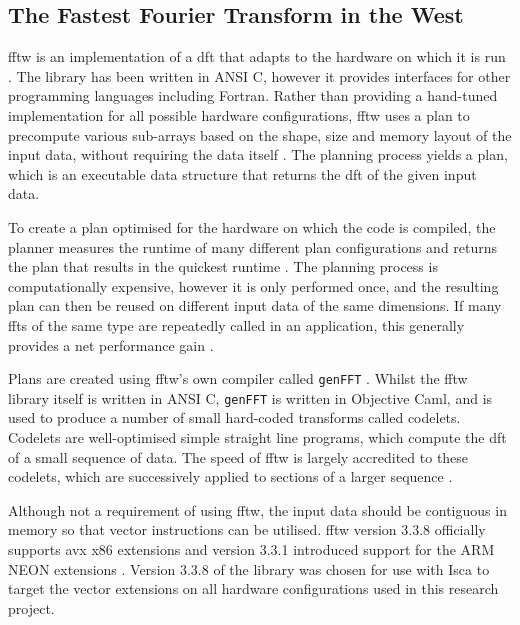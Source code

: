 \documentclass[a4paper,11pt]{report}
\begin{document}
\subsection{The Fastest Fourier Transform in the West}
\gls{fftw} is an implementation of a \gls{dft} that adapts to the hardware on which it is run \cite{frigo2005design}. The library has been written in ANSI C, however it provides interfaces for other programming languages including Fortran. Rather than providing a hand-tuned implementation for all possible hardware configurations, \gls{fftw} uses a plan to precompute various sub-arrays based on the shape, size and memory layout of the input data, without requiring the data itself \cite{frigo2005design}. The planning process yields a plan, which is an executable data structure that returns the \gls{dft} of the given input data. 
\par
To create a plan optimised for the hardware on which the code is compiled, the planner measures the runtime of many different plan configurations and returns the plan that results in the quickest runtime \cite{frigo2005design}. The planning process is computationally expensive, however it is only performed once, and the resulting plan can then be reused on different input data of the same dimensions. If many \gls{fft}s of the same type are repeatedly called in an application, this generally provides a net performance gain \cite{frigo2003fftw}.
\par
Plans are created using \gls{fftw}'s own compiler called \texttt{genFFT}  \cite{frigo2005design}. Whilst the \gls{fftw} library itself is written in ANSI C, \texttt{genFFT} is written in Objective Caml, and is used to produce a number of small hard-coded transforms called codelets. Codelets are well-optimised simple straight line programs, which compute the \gls{dft} of a small sequence of data. The speed of \gls{fftw} is largely accredited to these codelets, which are successively applied to sections of a larger sequence \cite{frigo2005design}. 
\par
Although not a requirement of using \gls{fftw}, the input data should be contiguous in memory so that vector instructions can be utilised. \gls{fftw} version 3.3.8 officially supports \gls{avx} x86 extensions and version 3.3.1 introduced support for the ARM NEON extensions \cite{frigo2003fftw}. Version 3.3.8 of the library was chosen for use with Isca to target the vector extensions on all hardware configurations used in this research project. 
\end{document}
